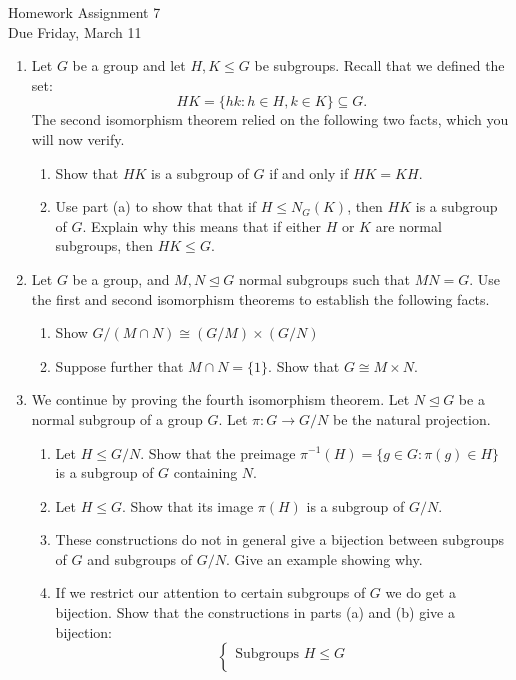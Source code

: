 \documentclass[11pt]{article}
\begin{document}
\begin{center}
\Large {Homework Assignment 7}\\
\small {Due Friday, March 11}
\end{center}
\begin{enumerate}
  \item{
  Let $G$ be a group and let $H,K\le G$ be subgroups.  Recall that we defined the set:
  \[HK = \{hk: h\in H,k\in K\}\subseteq G.\]
  The second isomorphism theorem relied on the following two facts, which you will now verify.
  \begin{enumerate}
  \item{Show that $HK$ is a subgroup of $G$ if and only if $HK = KH$.}
  \item{Use part (a) to show that that if $H\le N_G(K)$, then $HK$ is a subgroup of $G$.  Explain why this means that if either $H$ or $K$ are normal subgroups, then $HK\le G$.}
  \end{enumerate}
  }
  \item Let $G$ be a group, and $M,N\unlhd G$ normal subgroups such that $MN = G$.  Use the first and second isomorphism theorems to establish the following facts.
  \begin{enumerate}
    \item Show $G/(M\cap N)\cong (G/M)\times (G/N)$
    \item Suppose further that $M\cap N=\{1\}$.  Show that $G\cong M\times N$.
  \end{enumerate}  
  \item{
  We continue by proving the fourth isomorphism theorem.  Let $N\unlhd G$ be a normal subgroup of a group $G$.  Let $\pi:G\to G/N$ be the natural projection.
  \begin{enumerate}
    \item Let $H\le G/N$.  Show that the preimage $\pi^{-1}(H) = \{g\in G:\pi(g)\in H\}$ is a subgroup of $G$ containing $N$.
    \item Let $H\le G$.  Show that its image $\pi(H)$ is a subgroup of $G/N$.
    \item These constructions do not in general give a bijection between subgroups of $G$ and subgroups of $G/N$.  Give an example showing why.
    \item If we restrict our attention to certain subgroups of $G$ we do get a bijection.  Show that the constructions in parts (a) and (b) give a bijection:
    \[\left\{
    \begin{array}{c}
      \text{Subgroups }H\le G\\

\end{array}\]
\end{enumerate}}
\end{enumerate}
\end{document}
